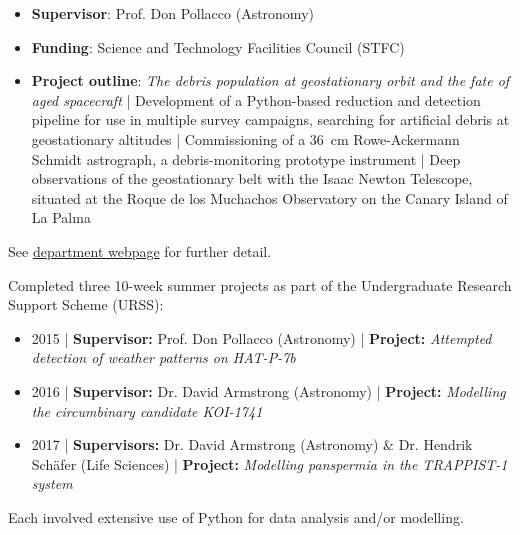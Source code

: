 \documentclass[10pt,a4paper]{altacv}
\begin{document}

\begin{fullwidth}
\makecvheader
\end{fullwidth}



\begin{itemize}
\item \textbf{Supervisor}: Prof. Don Pollacco (Astronomy)
\item \textbf{Funding}: Science and Technology Facilities Council (STFC)
\item \justify \textbf{Project outline}: \textit{The debris population at geostationary orbit and the fate of aged spacecraft} |
Development of a Python-based reduction and detection pipeline for use in multiple survey campaigns, searching for artificial debris at geostationary altitudes |
Commissioning of a 36~cm Rowe-Ackermann Schmidt astrograph, a debris-monitoring prototype instrument |
Deep observations of the geostationary belt with the Isaac Newton Telescope, situated at the Roque de los Muchachos Observatory on the Canary Island of La Palma
\end{itemize}
\small See \href{https://warwick.ac.uk/fac/sci/physics/research/astro/people/jamesblake/}{department webpage} for further detail.

\divider

\vspace{-1em}
\small \justify Completed three 10-week summer projects as part of the Undergraduate Research Support Scheme (URSS):
\begin{itemize}
\item 2015 | \textbf{Supervisor:} Prof. Don Pollacco (Astronomy) | \textbf{Project:} \textit{Attempted detection of weather patterns on HAT-P-7b}
\item 2016 | \textbf{Supervisor:} Dr. David Armstrong (Astronomy) | \textbf{Project:} \textit{Modelling the circumbinary candidate KOI-1741}
\item 2017 | \textbf{Supervisors:} Dr. David Armstrong (Astronomy) \& Dr. Hendrik Sch{\"a}fer (Life Sciences) | \textbf{Project:} \textit{Modelling panspermia in the TRAPPIST-1 system}
\end{itemize}
Each involved extensive use of Python for data analysis and/or modelling.
\end{document}
